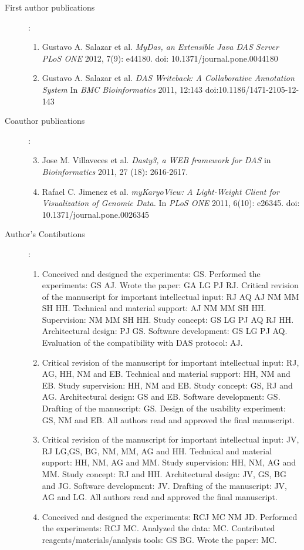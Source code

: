 \begin{description}
	\item[First author publications]:\\
		\begin{enumerate}
			\item Gustavo A. Salazar et al. \emph{MyDas, an Extensible Java DAS Server} \emph{PLoS ONE} 2012, 7(9): e44180. doi: 10.1371/journal.pone.0044180
			\item Gustavo A. Salazar et al. \emph{DAS Writeback: A Collaborative Annotation System} In \emph{BMC Bioinformatics} 2011, 12:143  doi:10.1186/1471-2105-12-143
		\end{enumerate}
 	\item[Coauthor publications]:\\
		\begin{enumerate}
			\setcounter{enumi}{2}
			\item Jose M. Villaveces et al. \emph{Dasty3, a WEB framework for DAS} in  \emph{Bioinformatics}  2011, 27 (18): 2616-2617.
			\item Rafael C. Jimenez et al. \emph{myKaryoView: A Light-Weight Client for Visualization of Genomic Data. } In \emph{PLoS ONE} 2011, 6(10): e26345. doi: 10.1371/journal.pone.0026345
		\end{enumerate}

	\item[Author's Contibutions]:\\
		\begin{enumerate}
			\item Conceived and designed the experiments: GS. Performed the experiments: GS AJ. Wrote the paper: GA LG PJ RJ. Critical revision of the manuscript for important intellectual input: RJ AQ AJ NM MM SH HH. Technical and material support: AJ NM MM SH HH. Supervision: NM MM SH HH. Study concept: GS LG PJ AQ RJ HH. Architectural design: PJ GS. Software development: GS LG PJ AQ. Evaluation of the compatibility with DAS protocol: AJ.
			\item Critical revision of the manuscript for important intellectual input: RJ, AG, HH, NM and EB. Technical and material support: HH, NM and EB. Study supervision: HH, NM and EB. Study concept: GS, RJ and AG. Architectural design: GS and EB. Software development: GS. Drafting of the manuscript: GS. Design of the usability experiment: GS, NM and EB. All authors read and approved the final manuscript.
			\item Critical revision of the manuscript for important intellectual input: JV, RJ LG,GS, BG, NM, MM, AG and HH. Technical and material support: HH, NM, AG and MM. Study supervision: HH, NM, AG and MM. Study concept:  RJ and HH. Architectural design: JV, GS, BG and JG. Software development: JV. Drafting of the manuscript: JV, AG and LG. All authors read and approved the final manuscript.
			\item Conceived and designed the experiments: RCJ MC NM JD. Performed the experiments: RCJ MC. Analyzed the data: MC. Contributed reagents/materials/analysis tools: GS BG. Wrote the paper: MC.
		\end{enumerate}
\end{description}


